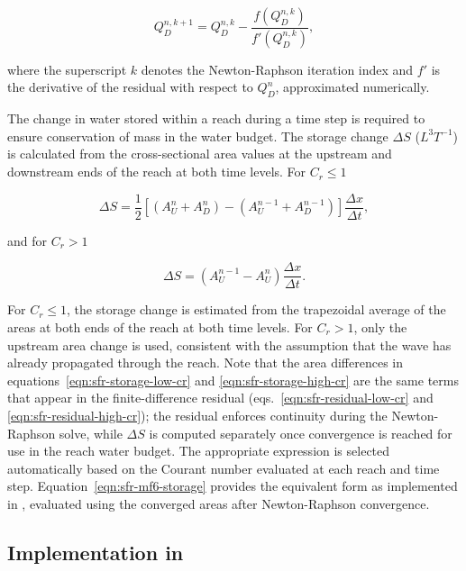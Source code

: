 \begin{equation}
	\label{eqn:sfr-newton}
	Q_D^{n, k+1} = Q_D^{n, k} - \frac{f \left( Q_D^{n, k} \right)}{f' \left( Q_D^{n, k} \right)} ,
\end{equation}

\noindent where the superscript $k$ denotes the Newton-Raphson iteration index and $f'$ is the derivative of the residual with respect to $Q_D^n$, approximated numerically.

The change in water stored within a reach during a time step is required to ensure conservation of mass in the water budget. The storage change $\Delta S$ ($L^3T^{-1}$) is calculated from the cross-sectional area values at the upstream and downstream ends of the reach at both time levels. For $C_r \le 1$

\begin{equation}
	\label{eqn:sfr-storage-low-cr}
	\Delta S = \frac{1}{2} \left[ \left( A_U^n + A_D^n \right) - \left( A_U^{n-1} + A_D^{n-1} \right) \right] \frac{\Delta x}{\Delta t} ,
\end{equation}

\noindent and for $C_r > 1$

\begin{equation}
	\label{eqn:sfr-storage-high-cr}
	\Delta S = \left( A_U^{n-1} - A_U^n \right) \frac{\Delta x}{\Delta t} .
\end{equation}

\noindent For $C_r \le 1$, the storage change is estimated from the trapezoidal average of the areas at both ends of the reach at both time levels. For $C_r > 1$, only the upstream area change is used, consistent with the assumption that the wave has already propagated through the reach. Note that the area differences in equations~\ref{eqn:sfr-storage-low-cr} and \ref{eqn:sfr-storage-high-cr} are the same terms that appear in the finite-difference residual (eqs.~\ref{eqn:sfr-residual-low-cr} and \ref{eqn:sfr-residual-high-cr}); the residual enforces continuity during the Newton-Raphson solve, while $\Delta S$ is computed separately once convergence is reached for use in the reach water budget. The appropriate expression is selected automatically based on the Courant number evaluated at each reach and time step. Equation~\ref{eqn:sfr-mf6-storage} provides the equivalent form as implemented in \mf, evaluated using the converged areas after Newton-Raphson convergence.

\subsection{Implementation in \mf}

